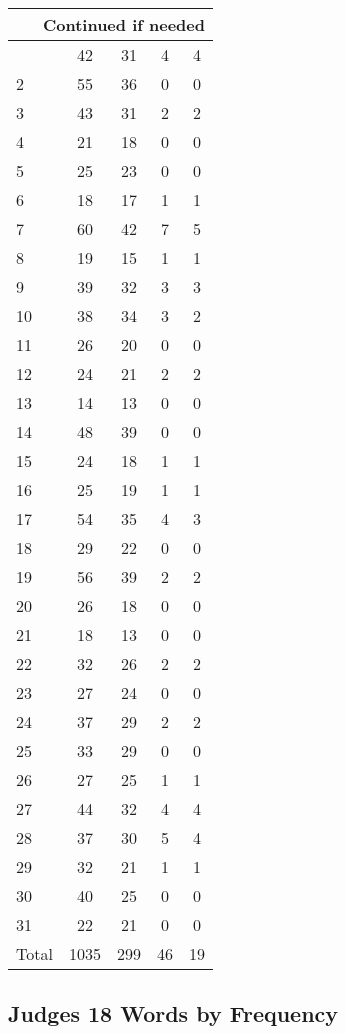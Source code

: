 \begin{center}
\begin{longtable}{l|c|c|c|c}
\hline \multicolumn{5}{|r|}{{Continued if needed}} \\ \hline
\endfoot 
1 & 42 & 31 & 4 & 4\\ \hline
2 & 55 & 36 & 0 & 0\\ \hline
3 & 43 & 31 & 2 & 2\\ \hline
4 & 21 & 18 & 0 & 0\\ \hline
5 & 25 & 23 & 0 & 0\\ \hline
6 & 18 & 17 & 1 & 1\\ \hline
7 & 60 & 42 & 7 & 5\\ \hline
8 & 19 & 15 & 1 & 1\\ \hline
9 & 39 & 32 & 3 & 3\\ \hline
10 & 38 & 34 & 3 & 2\\ \hline
11 & 26 & 20 & 0 & 0\\ \hline
12 & 24 & 21 & 2 & 2\\ \hline
13 & 14 & 13 & 0 & 0\\ \hline
14 & 48 & 39 & 0 & 0\\ \hline
15 & 24 & 18 & 1 & 1\\ \hline
16 & 25 & 19 & 1 & 1\\ \hline
17 & 54 & 35 & 4 & 3\\ \hline
18 & 29 & 22 & 0 & 0\\ \hline
19 & 56 & 39 & 2 & 2\\ \hline
20 & 26 & 18 & 0 & 0\\ \hline
21 & 18 & 13 & 0 & 0\\ \hline
22 & 32 & 26 & 2 & 2\\ \hline
23 & 27 & 24 & 0 & 0\\ \hline
24 & 37 & 29 & 2 & 2\\ \hline
25 & 33 & 29 & 0 & 0\\ \hline
26 & 27 & 25 & 1 & 1\\ \hline
27 & 44 & 32 & 4 & 4\\ \hline
28 & 37 & 30 & 5 & 4\\ \hline
29 & 32 & 21 & 1 & 1\\ \hline
30 & 40 & 25 & 0 & 0\\ \hline
31 & 22 & 21 & 0 & 0\\ \hline
Total & 1035 & 299 & 46 & 19
\end{longtable}
\end{center}





\subsection{Judges 18 Words by Frequency}


